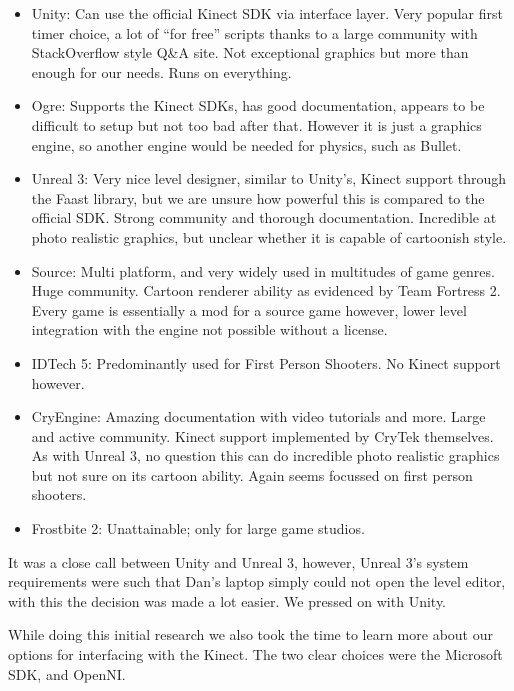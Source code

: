\documentclass[a4paper,oneside]{memoir}
\begin{document}
		\begin{itemize}
			\item Unity: Can use the official Kinect SDK via interface layer. Very popular first timer choice, a lot of ``for free'' scripts thanks to a large community with StackOverflow style Q\&A site. Not exceptional graphics but more than enough for our needs. Runs on everything.
			\item Ogre: Supports the Kinect SDKs, has good documentation, appears to be difficult to setup but not too bad after that. However it is just a graphics engine, so another engine would be needed for physics, such as Bullet.
			\item Unreal 3: Very nice level designer, similar to Unity's, Kinect support through the Faast library, but we are unsure how powerful this is compared to the official SDK. Strong community and thorough documentation. Incredible at photo realistic graphics, but unclear whether it is capable of cartoonish style.
			\item Source: Multi platform, and very widely used in multitudes of game genres. Huge community. Cartoon renderer ability as evidenced by Team Fortress 2. Every game is essentially a mod for a source game however, lower level integration with the engine not possible without a license.
			\item IDTech 5: Predominantly used for First Person Shooters. No Kinect support however.
			\item CryEngine: Amazing documentation with video tutorials and more. Large and active community. Kinect support implemented by CryTek themselves. As with Unreal 3, no question this can do incredible photo realistic graphics but not sure on its cartoon ability. Again seems focussed on first person shooters.
			\item Frostbite 2: Unattainable; only for large game studios.
		\end{itemize}

		It was a close call between Unity and Unreal 3, however, Unreal 3's system requirements were such that Dan's laptop simply could not open the level editor, with this the decision was made a lot easier. We pressed on with Unity.

		While doing this initial research we also took the time to learn more about our options for interfacing with the Kinect. The two clear choices were the Microsoft SDK, and OpenNI.
\end{document}
